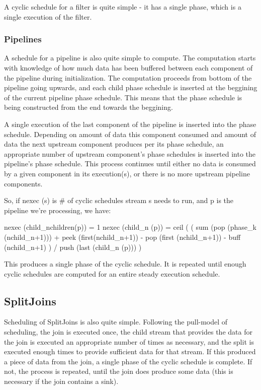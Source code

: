 A cyclic schedule for a filter is quite simple - it has a single phase,
which is a single execution of the filter.

\subsubsection{Pipelines}

A schedule for a pipeline is also quite simple to compute.  The
computation starts with knowledge of how much data has been buffered
between each component of the pipeline during initialization.  The
computation proceeds from bottom of the pipeline going upwards, and each
child phase schedule is inserted at the beggining of the current pipeline
phase schedule.  This means that the phase schedule is being constructed
from the end towards the beggining.

A single execution of the last component of the pipeline is inserted into
the phase schedule.  Depending on amount of data this component consumed
and amount of data the next upstream component produces per its phase
schedule, an appropriate number of upstream component's phase schedules is
inserted into the pipeline's phase schedule.  This process continues until
either no data is consumed by a given component in its execution(s), or
there is no more upstream pipeline components.

So, if nexec (s) is # of cyclic schedules stream s needs to run, and p is
the pipeline we're processing, we have:

nexec (child_{nchildren(p)}) = 1
nexec (child_n (p)) = ceil (
                             (   sum (pop (phase_k (nchild_{n+1})))
     			       + peek (first(nchild_{n+1})) - pop (first (nchild_{n+1}))
                               - buff (nchild_{n+1})
		             ) 
			     / push (last (child_n (p)))
			   )

This produces a single phase of the cyclic schedule.  It is repeated until
enough cyclic schedules are computed for an entire steady execution
schedule.

\subsection{SplitJoins}

Scheduling of SplitJoins is also quite simple.  Following the pull-model
of scheduling, the join is executed once, the child stream that provides
the data for the join is executed an appropriate number of times as
necessary, and the split is executed enough times to provide sufficient data
for that stream.  If this produced a piece of data from the join, a single
phase of the cyclic schedule is complete.  If not, the process is
repeated, until the join does produce some data (this is necessary if the
join contains a sink).

